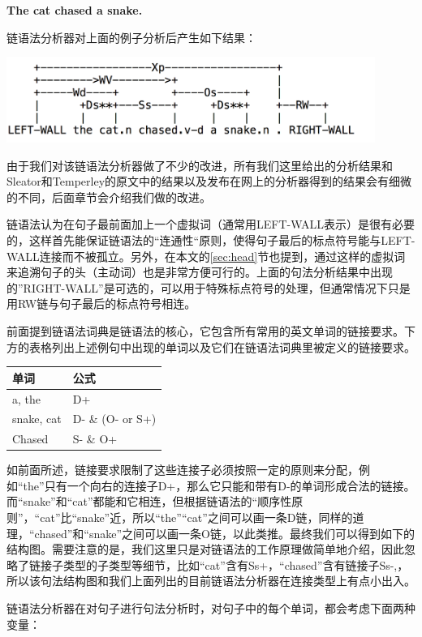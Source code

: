 \begin{center}
\textbf{The cat chased a snake.}
\end{center}

链语法分析器对上面的例子分析后产生如下结果：

\includegraphics[width=12cm]{figures/catSnake.png}

由于我们对该链语法分析器做了不少的改进，所有我们这里给出的分析结果和Sleator和Temperley的原文中的结果以及发布在网上的分析器得到的结果会有细微的不同，后面章节会介绍我们做的改进。

链语法认为在句子最前面加上一个虚拟词（通常用LEFT-WALL表示）是很有必要的，这样首先能保证链语法的“连通性“原则，使得句子最后的标点符号能与LEFT-WALL连接而不被孤立。另外，在本文的\ref{sec:head}节也提到，通过这样的虚拟词来追溯句子的头（主动词）也是非常方便可行的。上面的句法分析结果中出现的”RIGHT-WALL”是可选的，可以用于特殊标点符号的处理，但通常情况下只是用RW链与句子最后的标点符号相连。

前面提到链语法词典是链语法的核心，它包含所有常用的英文单词的链接要求。下方的表格列出上述例句中出现的单词以及它们在链语法词典里被定义的链接要求。

\begin{tabular}{|p{2.0in}|p{2.1in}|} \hline 
\textbf{单词} & \textbf{公式} \\ \hline 
a, the & D+ \\ \hline 
snake, cat & D- \& (O- or S+) \\ \hline 
Chased & S- \& O+ \\ \hline 
\end{tabular}

如前面所述，链接要求限制了这些连接子必须按照一定的原则来分配，例如“the”只有一个向右的连接子D+，那么它只能和带有D-的单词形成合法的链接。而“snake”和“cat”都能和它相连，但根据链语法的“顺序性原则”，“cat”比“snake”近，所以“the”“cat”之间可以画一条D链，同样的道理，“chased”和“snake”之间可以画一条O链，以此类推。最终我们可以得到如下的结构图。需要注意的是，我们这里只是对链语法的工作原理做简单地介绍，因此忽略了链接子类型的子类型等细节，比如“cat”含有Ss+，“chased”含有链接子Ss-,，所以该句法结构图和我们上面列出的目前链语法分析器在连接类型上有点小出入。 

链语法分析器在对句子进行句法分析时，对句子中的每个单词，都会考虑下面两种变量：

